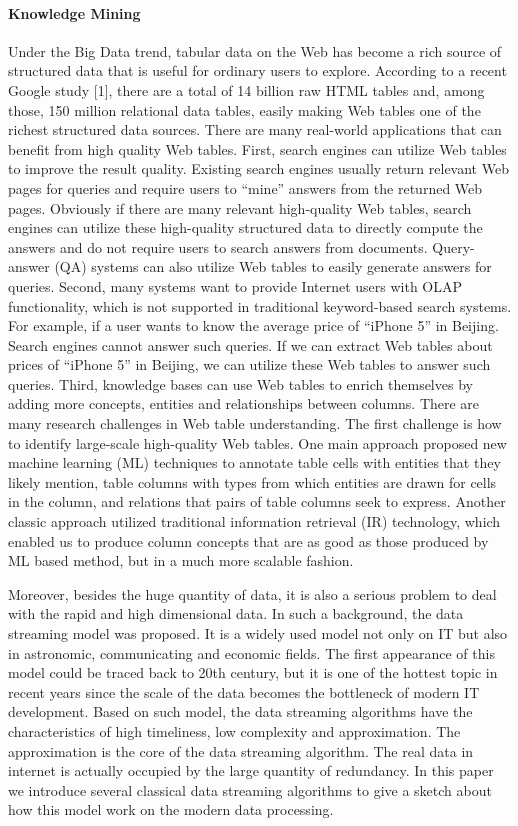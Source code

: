 \documentclass{article} %
\begin{document}
\paragraph{Knowledge Mining}Under the Big Data trend, tabular data on the Web has become a rich source of structured data that is useful for ordinary users to explore.  According to a recent Google study [1], there are a total of 14 billion raw HTML tables and, among those, 150 million relational data tables, easily making Web tables one of the richest structured data sources. There are many real-world applications that can benefit from high quality Web tables. First, search engines can utilize Web tables to improve the result quality. Existing search engines usually return relevant Web pages for queries and require users to “mine” answers from the returned Web pages. Obviously if there are many relevant high-quality Web tables, search engines can utilize these high-quality structured data to directly compute the answers and do not require users to search answers from documents. Query-answer (QA) systems can also utilize Web tables to easily generate answers for queries. Second, many systems want to provide Internet users with OLAP functionality, which is not supported in traditional keyword-based search systems. For example, if a user wants to know the average price of “iPhone 5” in Beijing. Search engines cannot answer such queries. If we can extract Web tables about prices of “iPhone 5” in Beijing, we can utilize these Web tables to answer such queries. Third, knowledge bases can use Web tables to enrich themselves by adding more concepts, entities and relationships between columns.
There are many research challenges in Web table understanding. The first challenge is how to identify large-scale high-quality Web tables. One main approach proposed new machine learning (ML) techniques to annotate table cells with entities that they likely mention, table columns with types from which entities are drawn for cells in the column, and relations that pairs of table columns seek to express. Another classic approach utilized traditional information retrieval (IR) technology, which enabled us to produce column concepts that are as good as those produced by ML based method, but in a much more scalable fashion.

Moreover, besides the huge quantity of data, it is also a serious problem to deal with the rapid and high dimensional data. In such a background, the data streaming model was proposed. It is a widely used model not only on IT but also in astronomic, communicating and economic fields. The first appearance of this model could be traced back to 20th century, but it is one of the hottest topic in recent years since the scale of the data becomes the bottleneck of modern IT development. Based on such model, the data streaming algorithms have the characteristics of high timeliness, low complexity and approximation. The approximation is the core of the data streaming algorithm. The real data in internet is actually occupied by the large quantity of redundancy. In this paper we introduce several classical data streaming algorithms to give a sketch about how this model work on the modern data processing.
\end{document}
